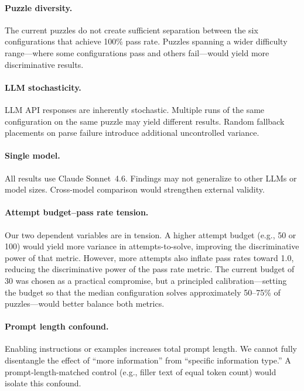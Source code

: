 \documentclass[11pt]{article}
\begin{document}
\paragraph{Puzzle diversity.}
The current puzzles do not create sufficient separation between the six configurations that achieve 100\% pass rate.
Puzzles spanning a wider difficulty range---where some configurations pass and others fail---would yield more discriminative results.

\paragraph{LLM stochasticity.}
LLM API responses are inherently stochastic.
Multiple runs of the same configuration on the same puzzle may yield different results.
Random fallback placements on parse failure introduce additional uncontrolled variance.

\paragraph{Single model.}
All results use Claude Sonnet~4.6.
Findings may not generalize to other LLMs or model sizes.
Cross-model comparison would strengthen external validity.

\paragraph{Attempt budget--pass rate tension.}
Our two dependent variables are in tension.
A higher attempt budget (e.g., 50 or 100) would yield more variance in attempts-to-solve, improving the discriminative power of that metric.
However, more attempts also inflate pass rates toward 1.0, reducing the discriminative power of the pass rate metric.
The current budget of 30 was chosen as a practical compromise, but a principled calibration---setting the budget so that the median configuration solves approximately 50--75\% of puzzles---would better balance both metrics.

\paragraph{Prompt length confound.}
Enabling instructions or examples increases total prompt length.
We cannot fully disentangle the effect of ``more information'' from ``specific information type.''
A prompt-length-matched control (e.g., filler text of equal token count) would isolate this confound.

\end{document}
